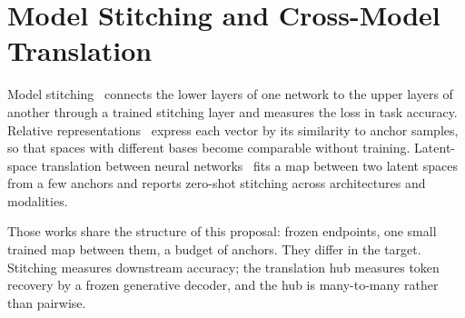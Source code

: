 \section{Model Stitching and Cross-Model Translation}\label{sec:lit:stitching}

Model stitching~ connects the lower layers of one network to the upper layers of another through a trained stitching layer and measures the loss in task accuracy. Relative representations~ express each vector by its similarity to anchor samples, so that spaces with different bases become comparable without training. Latent-space translation between neural networks~ fits a map between two latent spaces from a few anchors and reports zero-shot stitching across architectures and modalities.

Those works share the structure of this proposal: frozen endpoints, one small trained map between them, a budget of anchors. They differ in the target. Stitching measures downstream accuracy; the translation hub measures token recovery by a frozen generative decoder, and the hub is many-to-many rather than pairwise. 
